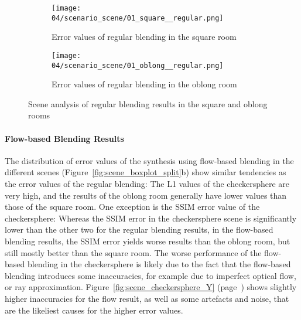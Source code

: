 \begin{figure}
\centering
    \hfill
    \begin{subfigure}[b]{0.4\textwidth}
            \centering
            \texttt{[image: 04/scenario\_scene/01\_square\_\_regular.png]}
            \caption{Error values of regular blending in the square room}
    \end{subfigure}
    \hfill
    \begin{subfigure}[b]{0.4\textwidth}
            \centering
            \texttt{[image: 04/scenario\_scene/01\_oblong\_\_regular.png]}
            \caption{Error values of regular blending in the oblong room}
    \end{subfigure}
    \hfill
  \caption{Scene analysis of regular blending results in the square and oblong rooms} \label{fig:scene_regular_square_oblong}
\end{figure}

\paragraph{Flow-based Blending Results}
The distribution of error values of the synthesis using flow-based blending in the different scenes (Figure~\ref{fig:scene_boxplot_split}b) show similar tendencies as the error values of the regular blending: The L1 values of the checkersphere are very high, and the results of the oblong room generally have lower values than those of the square room. One exception is the SSIM error value of the checkersphere: Whereas the SSIM error in the checkersphere scene is significantly lower than the other two for the regular blending results, in the flow-based blending results, the SSIM error yields worse results than the oblong room, but still mostly better than the square room. The worse performance of the flow-based blending in the checkersphere is likely due to the fact that the flow-based blending introduces some inaccuracies, for example due to imperfect optical flow, or ray approximation. Figure~\ref{fig:scene_checkersphere_Y} (page~\pageref{fig:scene_checkersphere_Y}) shows slightly higher inaccuracies for the flow result, as well as some artefacts and noise, that are the likeliest causes for the higher error values.

